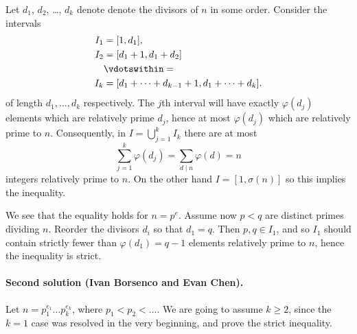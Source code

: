 \documentclass[11pt]{scrartcl}
\begin{document}
Let $d_1$, $d_2$, \dots, $d_k$ denote
denote the divisors of $n$ in some order.
Consider the intervals
\begin{align*}
  I_1 &= [1, d_1], \\
  I_2 &= [d_1+1, d_1+d_2] \\
  &\vdotswithin= \\
  I_k &= [d_1+\dots+d_{k-1}+1, d_1+\dots+d_k].
\end{align*}
of length $d_1, \dots, d_k$ respectively.
The $j$th interval will have exactly $\varphi(d_j)$ elements
which are relatively prime $d_j$,
hence at most $\varphi(d_j)$ which are relatively prime to $n$.
Consequently, in $I = \bigcup_{j=1}^k I_k$
there are at most
\[ \sum_{j=1}^k \varphi(d_j) = \sum_{d \mid n} \varphi(d) = n \]
integers relatively prime to $n$.
On the other hand $I = [1,\sigma(n)]$ so this implies the inequality.

We see that the equality holds for $n = p^e$.
Assume now $p < q$ are distinct primes dividing $n$.
Reorder the divisors $d_i$ so that $d_1 = q$.
Then $p,q \in I_1$, and so $I_1$ should contain
strictly fewer than $\varphi(d_1)=q-1$ elements
relatively prime to $n$, hence the inequality is strict.

\paragraph{Second solution (Ivan Borsenco and Evan Chen).}
Let $n = p_1^{e_1} \dots p_k^{e_k}$,
where $p_1 < p_2 < \dots$.
We are going to assume $k \ge 2$,
since the $k=1$ case was resolved in the very beginning,
and prove the strict inequality.
\end{document}
